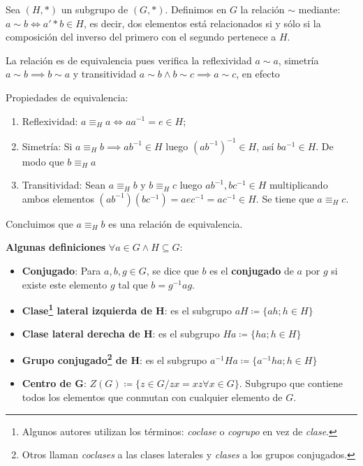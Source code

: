 	Sea $(H, *)$ un subgrupo de $(G, *)$. Definimos en $G$ la relación $\sim$ mediante: $a \sim b \iff a' * b \in H$, es decir, dos elementos está relacionados si y sólo si la composición del inverso del primero con el segundo pertenece a $H$.
	
	La relación es de equivalencia pues verifica la reflexividad $a \sim a$, simetría $a\sim b \implies b \sim a$ y transitividad $a\sim b \land b \sim c \implies a \sim c$, en efecto
	
	\begin{fmd-proof} Propiedades de equivalencia:
		\begin{enumerate}[label=\roman*)]
			\item Reflexividad: $a \equiv_{H} a \iff aa^{-1} = e \in H$;
			\item Simetría: Si $a \equiv_{H} b \implies ab^{-1} \in H$ luego $(ab^{-1})^{-1} \in H$, así $ba^{-1} \in H$. De modo que $b \equiv_{H} a$
			\item Transitividad: Sean $a \equiv_{H} b$ y $b \equiv_{H} c$ luego $ab^{-1}, bc^{-1} \in H$ multiplicando ambos elementos $\left(ab^{-1}\right) \left(bc^{-1}\right) = aec^{-1} = ac^{-1} \in H$. Se tiene que $a \equiv_{H} c$.
		\end{enumerate}
		Concluimos que $a \equiv_{H} b$ es una relación de equivalencia.
	\end{fmd-proof}
	
	\textbf{Algunas definiciones} $\forall a \in G \land H \subseteq G$:
	\begin{itemize}
		\item \textbf{Conjugado}: Para $a,b, g \in G$, se dice que $b$ es el \textbf{conjugado} de $a$ por $g$ si existe este elemento $g$ tal que $b = g^{-1}ag$.
		\item \textbf{Clase\footnote{Algunos autores utilizan los términos: \textit{coclase} o \textit{cogrupo} en vez de \textit{clase}.} lateral izquierda de H}: es el subgrupo $aH \coloneqq \{ah; h \in H\} $
		\item \textbf{Clase lateral derecha de H}: es el subgrupo $Ha \coloneqq \{ha; h \in H\} $
		\item \textbf{Grupo conjugado\footnote{Otros llaman \textit{coclases} a las clases laterales y \textit{clases} a los grupos conjugados.} de H}: es el subgrupo $a^{-1}Ha \coloneqq \{a^{-1}ha; h \in H\} $
		\item \textbf{Centro de G}: $Z(G) \coloneqq \{z\in G / zx = xz \forall x \in G\}$. Subgrupo que contiene todos los elementos que conmutan con cualquier elemento de $G$.
	\end{itemize}
	
